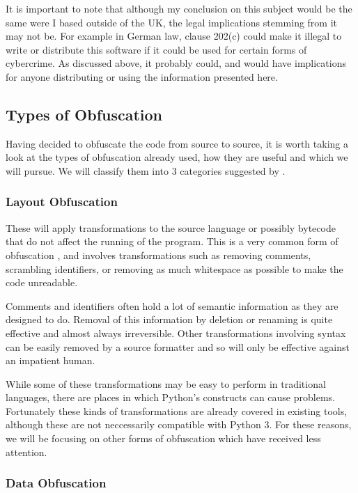 \documentclass{report}
\begin{document}
It is important to note that although my conclusion on this subject would be the same were I based outside of
the UK, the legal implications stemming from it may not be. For example in German law, clause 202(c) \cite{202c}
could make it illegal to write or distribute this software if it could be used for
certain forms of cybercrime. As discussed above, it probably could, and would have implications for anyone distributing
or using the information presented here.

\subsection{Types of Obfuscation}

Having decided to obfuscate the code from source to source, it is worth taking a look at the types of
obfuscation already used, how they are useful and which we will pursue. We will classify them into 3 categories
suggested by \cite[p10]{desevobf}.

\subsubsection{Layout Obfuscation}

These will apply transformations to the source language or possibly bytecode that do not affect the running of the
program. This is a very common form of obfuscation \cite[p10]{desevobf}, and involves transformations such as removing comments,
scrambling identifiers, or removing as much whitespace as possible to make the code unreadable.

Comments and identifiers often hold a lot of semantic information as they are designed to do.
Removal of this information by deletion or renaming is quite effective and almost always irreversible. Other transformations involving syntax
can be easily removed by a source formatter and so will only be effective against an impatient human.

While some of these transformations may be easy to perform in traditional languages, there are places in which
Python's constructs can cause problems. Fortunately these kinds of transformations are already covered in existing
tools, although these are not neccessarily compatible with Python 3. For these reasons, we will be focusing on other forms of
obfuscation which have received less attention.

\subsubsection{Data Obfuscation}
\end{document}
